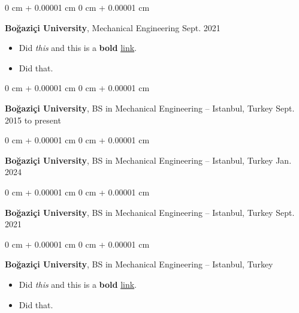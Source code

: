 \documentclass[10pt, letterpaper]{article}
\newenvironment{highlights}{
    \begin{itemize}[
        topsep=0.10 cm,
        parsep=0.10 cm,
        partopsep=0pt,
        itemsep=0pt,
        leftmargin=0 cm + 10pt
    ]
}{
    \end{itemize}
        
    \vspace{-0.20cm}
} %
\newenvironment{onecolentry}{
    \begin{adjustwidth}{
        0 cm + 0.00001 cm
    }{
        0 cm + 0.00001 cm
    }
}{
    \end{adjustwidth}
} %
\begin{document}
        \vspace{0.1 cm}

        \begin{onecolentry}
            \textbf{Boğaziçi University}, Mechanical Engineering \hfill Sept. 2021
            \begin{highlights}
                \item Did \textit{this} and this is a \textbf{bold} \href{https://example.com}{link}.
                \item Did that.
            \end{highlights}
        \end{onecolentry}

        \vspace{0.1 cm}

        \begin{onecolentry}
            \textbf{Boğaziçi University}, BS in Mechanical Engineering -- Istanbul, Turkey \hfill Sept. 2015 to present
        \end{onecolentry}

        \vspace{0.1 cm}

        \begin{onecolentry}
            \textbf{Boğaziçi University}, BS in Mechanical Engineering -- Istanbul, Turkey \hfill Jan. 2024
        \end{onecolentry}

        \vspace{0.1 cm}

        \begin{onecolentry}
            \textbf{Boğaziçi University}, BS in Mechanical Engineering -- Istanbul, Turkey \hfill Sept. 2021
        \end{onecolentry}

        \vspace{0.1 cm}

        \begin{onecolentry}
            \textbf{Boğaziçi University}, BS in Mechanical Engineering -- Istanbul, Turkey \hfill 
            \begin{highlights}
                \item Did \textit{this} and this is a \textbf{bold} \href{https://example.com}{link}.
                \item Did that.
            \end{highlights}
        \end{onecolentry}
\end{document}

